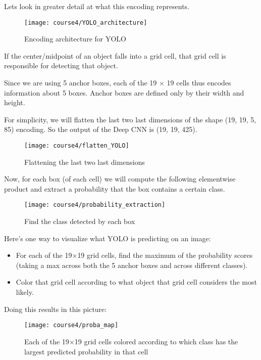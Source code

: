 Lets look in greater detail at what this encoding represents.
\begin{figure}[h]
\begin{center}
\texttt{[image: course4/YOLO\_architecture]}
\caption{Encoding architecture for YOLO}
\label{YOLO_architecture}
\end{center}
\end{figure}

If the center/midpoint of an object falls into a grid cell, that grid cell is responsible for detecting that object.

Since we are using 5 anchor boxes, each of the 19 $\times$ 19 cells thus encodes information about 5 boxes. Anchor boxes are defined only by their width and height.

For simplicity, we will flatten the last two last dimensions of the shape (19, 19, 5, 85) encoding. So the output of the Deep CNN is (19, 19, 425).
\clearpage
\begin{figure}[h]
\begin{center}
\texttt{[image: course4/flatten\_YOLO]}
\caption{Flattening the last two last dimensions}
\end{center}
\end{figure}

Now, for each box (of each cell) we will compute the following elementwise product and extract a probability that the box contains a certain class.
\begin{figure}[h]
\begin{center}
\texttt{[image: course4/probability\_extraction]}
\caption{Find the class detected by each box}
\label{probability_extraction}
\end{center}
\end{figure}

Here's one way to visualize what YOLO is predicting on an image:
\begin{itemize}
\item For each of the 19$\times$19 grid cells, find the maximum of the probability scores (taking a max across both the 5 anchor boxes and across different classes).
\item Color that grid cell according to what object that grid cell considers the most likely.
\end{itemize}

Doing this results in this picture:
\begin{figure}[h]
\begin{center}
\texttt{[image: course4/proba\_map]}
\caption{Each of the 19$\times$19 grid cells colored according to which class has the largest predicted probability in that cell}
\end{center}
\end{figure}

